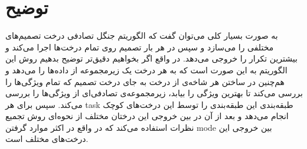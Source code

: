 \documentclass[11pt]{article}
\begin{document}
\section{توضیح }
به صورت بسیار کلی می‌توان گفت که الگوریتم جنگل تصادفی درخت تصمیم‌های مختلفی را می‌سازد و سپس در هر بار تصمیم روی تمام درخت‌ها اجرا می‌کند و بیشترین تکرار را خروجی می‌دهد. در واقع اگر بخواهیم دقیق‌تر توضیح بدهیم روش این الگوریتم به این صورت است که به هر درخت یک زیرمجموعه از داده‌ها را می‌دهد و هم‌چنین در ساختن هر شاخه‌‌ی از درخت به جای درخت تصمیم که تمام ویژگی‌ها را بررسی می‌کند تا بهترین ویژگی را بیابد، زیرمجموعه‌ی تصادفی‌ای از ویژگی‌ها را بررسی می‌کند. سپس برای هر task طبقه‌بندی این طبقه‌بندی را توسط این درخت‌های کوچک انجام می‌دهد و بعد از آن در بین خروجی این درختان مختلف از نحوه‌ای روش تجمیع نظرات استفاده می‌کند که در واقع در اکثر موارد گرفتن mode بین خروجی این درخت‌های مختلف است.
\end{document}
